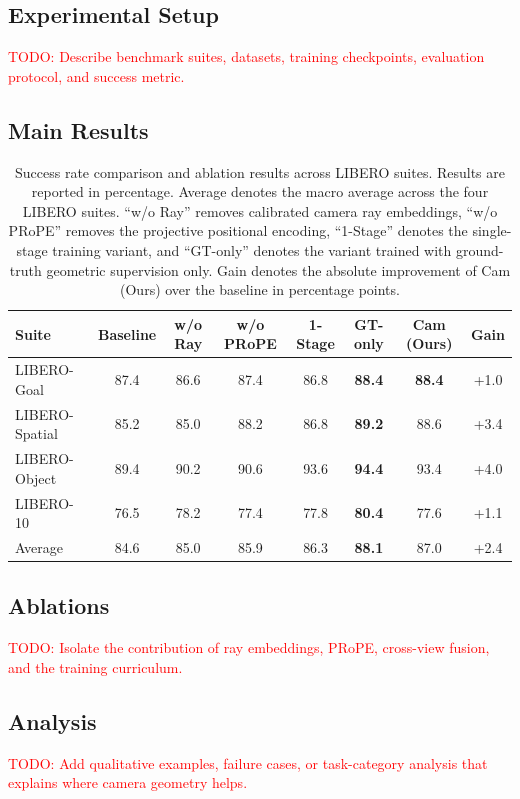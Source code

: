 \documentclass{article}
\newcommand{\todo}[1]{\textcolor{red}{TODO: #1}}
\begin{document}
\subsection{Experimental Setup}
\todo{Describe benchmark suites, datasets, training checkpoints, evaluation protocol, and success metric.}

\subsection{Main Results}
\begin{table}[H]
\centering
\small
\setlength{\tabcolsep}{3pt}
\begin{tabular}{lccccccc}
\toprule
Suite & Baseline & w/o Ray & w/o PRoPE & 1-Stage & GT-only & Cam (Ours) & Gain \\
\midrule
LIBERO-Goal    & 87.4 & 86.6 & 87.4 & 86.8 & \textbf{88.4} & \textbf{88.4} & +1.0 \\
LIBERO-Spatial & 85.2 & 85.0 & 88.2 & 86.8 & \textbf{89.2} & 88.6 & +3.4 \\
LIBERO-Object  & 89.4 & 90.2 & 90.6 & 93.6 & \textbf{94.4} & 93.4 & +4.0 \\
LIBERO-10      & 76.5 & 78.2 & 77.4 & 77.8 & \textbf{80.4} & 77.6 & +1.1 \\
\midrule
Average        & 84.6 & 85.0 & 85.9 & 86.3 & \textbf{88.1} & 87.0 & +2.4 \\
\bottomrule
\end{tabular}
\caption{Success rate comparison and ablation results across LIBERO suites. Results are reported in percentage. Average denotes the macro average across the four LIBERO suites. ``w/o Ray'' removes calibrated camera ray embeddings, ``w/o PRoPE'' removes the projective positional encoding, ``1-Stage'' denotes the single-stage training variant, and ``GT-only'' denotes the variant trained with ground-truth geometric supervision only. Gain denotes the absolute improvement of Cam (Ours) over the baseline in percentage points.}
\label{tab:libero_cam_ablation}
\end{table}

\subsection{Ablations}
\todo{Isolate the contribution of ray embeddings, PRoPE, cross-view fusion, and the training curriculum.}

\subsection{Analysis}
\todo{Add qualitative examples, failure cases, or task-category analysis that explains where camera geometry helps.}
\end{document}
